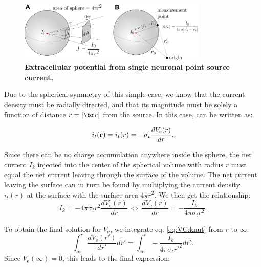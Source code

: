 \begin{figure}[!ht]
\begin{center}
\includegraphics[width=0.8\textwidth]{Figures/VC/EP_from_pointsource_illustration.png}
\end{center}
\caption{\textbf{Extracellular potential from single neuronal point source current.} 
}
\label{fig:VC:pointsource}
\end{figure}

Due to the spherical symmetry of this simple case, we know that the current density 
must be radially directed, and that its magnitude must be solely a function of distance $r = |{\br r}|$ from the source.
In this case,  can be written as:

\begin{equation}
i_t({\bf r}) = i_t(r) = -\sigma_t \frac{dV_\mathrm{e}(r)}{dr}.
\end{equation}

Since there can be no charge accumulation anywhere inside the sphere, 
the net current $I_k$ injected into the center of the spherical volume with radius $r$ 
must equal the net current leaving through the surface of the volume. 
The net current leaving the surface can in turn be found by multiplying 
the current density $i_t(r)$ at the surface with the surface area $4\pi r^2$. 
We then get the relationship:
\begin{equation}
I_k = -4\pi \sigma_t r^2  \frac{dV_\mathrm{e}(r)}{dr} \, \iff \, \frac{dV_\mathrm{e}(r)}{dr} = -\frac{I_k}{4\pi \sigma_t r^2 }.
\label{eq:VC:knut}
\end{equation}

To obtain the final solution for $V_\mathrm{e}$, we integrate eq. \ref{eq:VC:knut} from $r$ to $\infty$:
\begin{equation}
\int_{\infty}^r \frac{dV_\mathrm{e}(r')}{dr'} dr' = \int_{\infty}^r -\frac{I_k}{4\pi \sigma_t r'^2 } dr'.
\label{eq:VC:knut2}
\end{equation}
Since $V_\mathrm{e}({\infty}) = 0$, this leads to the final expression:

